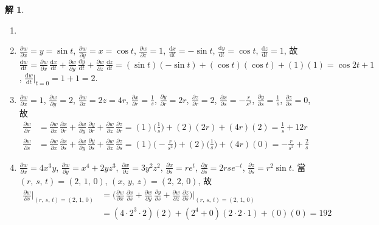 \documentclass[12pt]{extarticle}
\newcommand{\ds}{\displaystyle}
\theoremstyle{definition}
\newtheorem*{sol}{解}
\newcommand{\pdiff}[2]{\frac{\partial #1}{\partial #2}}
\newcommand{\diff}[2]{\frac{\mathrm{d} #1}{\mathrm{d} #2}}
\begin{document}
\begin{sol}
  \begin{enumerate}\setlength{\itemsep}{0pt}
    \item[]
    \item $\ds\pdiff{w}{x} = y = \sin t$, $\ds\pdiff{w}{y} = x = \cos t$, $\ds\pdiff{w}{z} = 1$, $\ds\diff{x}{t} = -\sin t$, $\ds\diff{y}{t} = \cos t$, $\ds\diff{z}{t} = 1$, 故 $\ds\diff{w}{t} = \pdiff{w}{x}\,\diff{x}{t} + \pdiff{w}{y}\,\diff{y}{t} + \pdiff{w}{z}\,\diff{z}{t} = (\sin t)(-\sin t) + (\cos t)(\cos t) + (1)(1) = \cos 2t + 1$, $\ds\diff{w}{t}\Big|_{t = 0} = 1 + 1 = 2$. 
    \item $\ds\pdiff{w}{x} = 1$, $\ds\pdiff{w}{y} = 2$, $\ds\pdiff{w}{z} = 2 z = 4 r$, $\ds\pdiff{x}{r} = \frac{1}{s}$, $\ds\pdiff{y}{r} = 2r$, $\ds\pdiff{z}{r} = 2$, $\ds\pdiff{x}{s} = -\frac{r}{s^2}$, $\ds\pdiff{y}{s} = \frac{1}{s}$, $\ds\pdiff{z}{s} = 0$, 故 
      \begin{align*}
        \pdiff{w}{r} &= \pdiff{w}{x}\,\pdiff{x}{r} + \pdiff{w}{y}\,\pdiff{y}{r} + \pdiff{w}{z}\,\pdiff{z}{r} = (1)\Big(\frac{1}{s}\Big) + (2)(2r) + (4r)(2) = \frac{1}{s} + 12 r \\
        \pdiff{w}{s} &= \pdiff{w}{x}\,\pdiff{x}{s} + \pdiff{w}{y}\,\pdiff{y}{s} + \pdiff{w}{z}\,\pdiff{z}{s} = (1)\Big(-\frac{r}{s^2}\Big) + (2)\Big(\frac{1}{s}\Big) + (4r)(0) = -\frac{r}{s^2} + \frac{2}{s}
      \end{align*}
    \item $\ds\pdiff{w}{x} = 4x^3y$, $\ds\pdiff{w}{y} = x^4 + 2yz^3$, $\ds\pdiff{w}{z} = 3y^2z^2$, $\ds\pdiff{x}{s} = re^{t}$, $\ds\pdiff{y}{s} = 2rse^{-t}$, $\ds\pdiff{z}{s} = r^2\sin t$. 當 $(r,\,s,\,t) = (2,\,1,\,0)$, $(x,\,y,\,z) = (2,\,2,\,0)$, 故
      \begin{align*}
        \pdiff{w}{s}\Big|_{(r,\,s,\,t) = (2,\,1,\,0)} &= \Big(\pdiff{w}{x}\,\pdiff{x}{s} + \pdiff{w}{y}\,\pdiff{y}{s} + \pdiff{w}{z}\,\pdiff{z}{s}\Big)\Big|_{(r,\,s,\,t) = (2,\,1,\,0)} \\ &= (4\cdot2^3\cdot2)(2) + (2^4 + 0)(2\cdot2\cdot1) + (0)(0) = 192
      \end{align*}
  \end{enumerate}
\end{sol}
\end{document}
